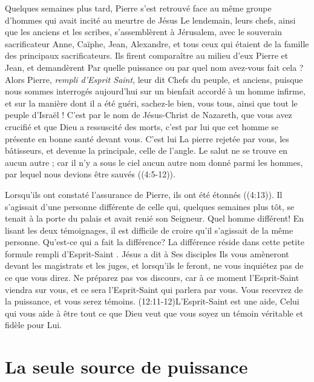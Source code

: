 Quelques semaines plus tard, Pierre s'est retrouvé face au même groupe
 d'hommes qui avait incité au meurtre de Jésus\frcolon{}
 \Og Le lendemain, leurs chefs, ainsi que les anciens et les scribes,
 s'assemblèrent à Jérusalem, avec le souverain sacrificateur Anne,
 Caïphe, Jean, Ale\-xandre, et tous ceux qui étaient de la famille
 des principaux sacrificateurs. Ils firent comparaître au milieu d'eux
 Pierre et Jean, et demandèrent\frcolon{} Par quelle puissance ou par quel nom
 avez-vous fait cela ? Alors Pierre, \emph{rempli d'Esprit Saint}, leur dit\frcolon{}
 Chefs du peuple, et anciens, puisque nous sommes interrogés aujourd'hui
 sur un bienfait accordé à un homme infirme, et sur la manière
 dont il a été guéri, sachez-le bien, vous tous, ainsi que tout le peuple
 d'Israël ! C'est par le nom de Jésus-Christ de Nazareth, que vous avez
 crucifié et que Dieu a ressuscité des morts, c'est par lui que cet homme
 se présente en bonne santé devant vous. C'est lui\frcolon{} La pierre rejetée
 par vous, les bâtisseurs, et devenue la principale, celle de l'angle.
 Le salut ne se trouve en aucun autre ; car il n'y a sous le ciel aucun
 autre nom donné parmi les hommes, par lequel nous devions être
 sauvés \Fg{} ((4:5-12)).

Lorsqu'ils ont constaté l'assurance de Pierre, ils ont été étonnés
 ((4:13)).
 Il s'agissait d'une personne différente
 de celle qui, quelques semaines plus tôt, se tenait à la porte du palais
 et avait renié son Seigneur. Quel homme différent!
 En lisant les deux témoignages, il est difficile de croire
 qu'il s'agissait de la même personne. Qu'est-ce qui a fait la différence?
 La différence réside dans cette petite formule\frcolon{}
 \Og rempli d'Esprit-Saint \Fg{}. Jésus a dit à Ses disciples\frcolon{}
 \Og Ils vous amèneront devant les magistrats et les juges,
 et lorsqu'ils le feront, ne vous inquiétez pas de ce que vous direz.
 Ne préparez pas vos discours, car à ce moment l'Esprit-Saint viendra
 sur vous, et ce sera l'Esprit-Saint qui parlera par vous.
 Vous recevrez de la puissance, et vous serez témoins. \Fg{}
 (12:11-12)L'Esprit-Saint est une aide,
 Celui qui vous aide à être tout ce que Dieu
 veut que vous soyez\frcolon{} un témoin véritable et fidèle pour Lui.


\section{La seule source de puissance}

